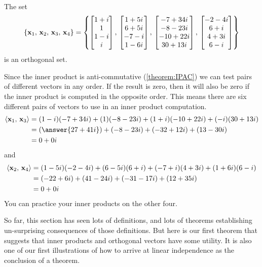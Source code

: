 \documentclass{ximera}
\begin{document}
\begin{example}

The set
\[
\left\{\mathbf{x}_1,\,\mathbf{x}_2,\,\mathbf{x}_3,\,\mathbf{x}_4\right\}=
\left\{
\begin{bmatrix}1+i\\1\\1-i\\i\end{bmatrix},\,
\begin{bmatrix}1+5i\\6+5i\\-7-i\\1-6i\end{bmatrix},\,
\begin{bmatrix}-7+34i\\-8-23i\\-10+22i\\30+13i\end{bmatrix},\,
\begin{bmatrix}-2-4i\\6+i\\4+3i\\6-i\end{bmatrix}
\right\}
\]
is an orthogonal set.


Since the inner product is anti-commutative (\ref{theorem:IPAC}) we can test pairs of different vectors in any order.  If the result is zero, then it will also be zero if the inner product is computed in the opposite order.  This means there are six different pairs of vectors to use in an inner product computation.
\begin{align*}
\innerproduct{\vect{x}_1}{\vect{x}_3}&=
(1-i)(-7+34i)+(1)(-8-23i)+(1+i)(-10+22i)+(-i)(30+13i)\\
&=(\answer{27+41i})+(-8-23i)+(-32+12i)+(13-30i)\\
&=0+0i
\end{align*}
and
\begin{align*}
\left\langle\mathbf{x}_2,\,\mathbf{x}_4\right\rangle&=
(1-5i)(-2-4i)+(6-5i)(6+i)+(-7+i)(4+3i)+(1+6i)(6-i)\\
&=(-22+6i)+(41-24i)+(-31-17i)+(12+35i)\\
&=0+0i
\end{align*}
You can practice your inner products on the other four.

\end{example}

So far, this section has seen lots of definitions, and lots of
theorems establishing un-surprising consequences of those definitions.
But here is our first theorem that suggests that inner products and
orthogonal vectors have some utility.  It is also one of our first
illustrations of how to arrive at linear independence as the
conclusion of a theorem.
\end{document}
